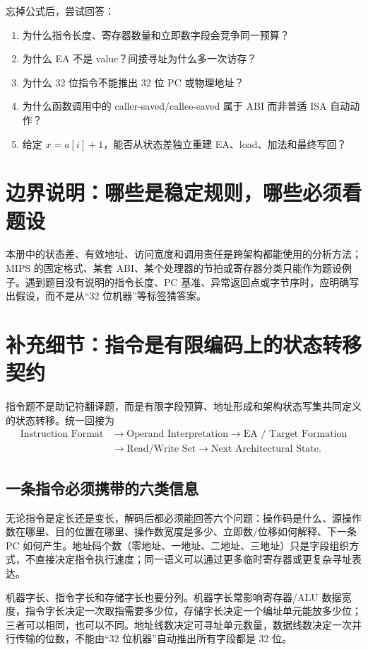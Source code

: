 \documentclass[UTF8,fontset=fandol,11pt,a4paper]{ctexart}
\begin{document}
忘掉公式后，尝试回答：
\begin{enumerate}
  \item 为什么指令长度、寄存器数量和立即数字段会竞争同一预算？
  \item 为什么 EA 不是 value？间接寻址为什么多一次访存？
  \item 为什么 32 位指令不能推出 32 位 PC 或物理地址？
  \item 为什么函数调用中的 caller-saved/callee-saved 属于 ABI 而非普适 ISA 自动动作？
  \item 给定 $x=a[i]+1$，能否从状态差独立重建 EA、load、加法和最终写回？
\end{enumerate}

\section{边界说明：哪些是稳定规则，哪些必须看题设}

本册中的状态差、有效地址、访问宽度和调用责任是跨架构都能使用的分析方法；MIPS 的固定格式、某套 ABI、某个处理器的节拍或寄存器分类只能作为题设例子。遇到题目没有说明的指令长度、PC 基准、异常返回点或字节序时，应明确写出假设，而不是从“32 位机器”等标签猜答案。

\section{补充细节：指令是有限编码上的状态转移契约}

指令题不是助记符翻译题，而是有限字段预算、地址形成和架构状态写集共同定义的状态转移。统一回接为
\[
\begin{aligned}
\text{Instruction Format}&\to\text{Operand Interpretation}\to\text{EA / Target Formation}\\
&\to\text{Read/Write Set}\to\text{Next Architectural State}.
\end{aligned}
\]

\subsection{一条指令必须携带的六类信息}

无论指令是定长还是变长，解码后都必须能回答六个问题：操作码是什么、源操作数在哪里、目的位置在哪里、操作数宽度是多少、立即数/位移如何解释、下一条 PC 如何产生。地址码个数（零地址、一地址、二地址、三地址）只是字段组织方式，不直接决定指令执行速度；同一语义可以通过更多临时寄存器或更复杂寻址表达。

机器字长、指令字长和存储字长也要分列。机器字长常影响寄存器/ALU 数据宽度，指令字长决定一次取指需要多少位，存储字长决定一个编址单元能放多少位；三者可以相同，也可以不同。地址线数决定可寻址单元数量，数据线数决定一次并行传输的位数，不能由“32 位机器”自动推出所有字段都是 32 位。
\end{document}
